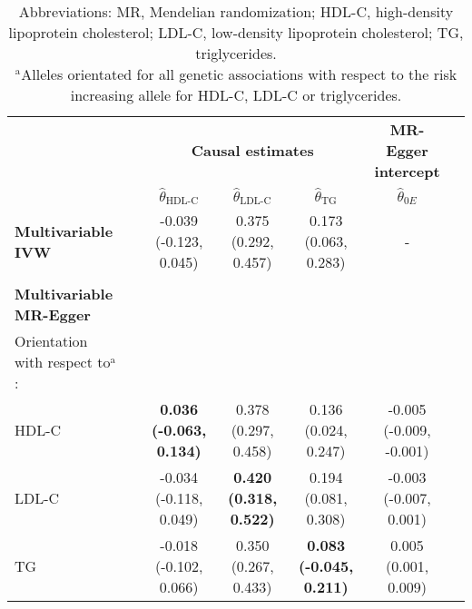 \documentclass[a4paper,12pt]{article}
\begin{document}
\begin{table}[h] %
\begin{center}
\begin{small}
\centering
\caption{Causal log odds ratios (95\% confidence intervals) for coronary heart disease per standard deviation increase in HDL-C, LDL-C, and triglycerides from multivariable IVW and multivariable MR-Egger. Estimates from multivariable MR-Egger are presented from three models where the reference allele is the risk increasing allele for HDL-C, LDL-C or triglycerides. Estimates of the intercept are given for multivariable MR-Egger.}
\resizebox{\textwidth}{!} { %
\begin{tabular}[c]{lR*{5}{c}} %
\toprule
{} &
 &
 \\
\cmidrule(r){3-5} \cmidrule(r){6-6}
 &
 &
 &
 &
 \\ [0.1cm]
\toprule
\textbf{Multivariable IVW} & & -0.039 (-0.123, 0.045) & 0.375 (0.292,	0.457) & 0.173 (0.063, 0.283) & - \\
\rule{0pt}{1ex} \\
\textbf{Multivariable MR-Egger}\\
Orientation with respect to$^{\mbox{a}}$:\\
HDL-C & & \textbf{0.036 (-0.063, 0.134)} & 0.378 (0.297, 0.458) & 0.136 (0.024, 0.247) & -0.005 (-0.009, -0.001) \\
LDL-C & & -0.034 (-0.118, 0.049) & \textbf{0.420 (0.318, 0.522)} &	0.194 (0.081, 0.308) & -0.003 (-0.007, 0.001)\\
TG & & -0.018 (-0.102, 0.066) & 0.350 (0.267, 0.433) & \textbf{0.083 (-0.045,	0.211)} & 0.005 (0.001, 0.009)\\
\bottomrule
\end{tabular}
}
\caption*{Abbreviations: MR, Mendelian randomization; HDL-C, high-density lipoprotein cholesterol; LDL-C, low-density lipoprotein cholesterol; TG, triglycerides.\\
$^{\mbox{a}}$Alleles orientated for all genetic associations with respect to the risk increasing allele for HDL-C, LDL-C or triglycerides.} \label{tab:orientation}
\end{small} %
\end{center}
\end{table}
\end{document}
